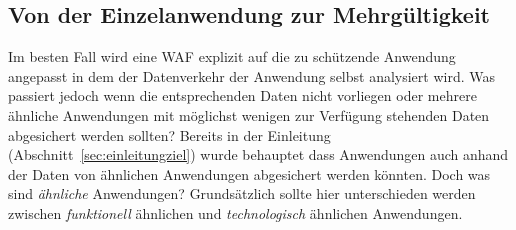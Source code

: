 


\subsection{Von der Einzelanwendung zur Mehrgültigkeit}
Im besten Fall wird eine WAF explizit auf die zu schützende Anwendung angepasst in dem der Datenverkehr der Anwendung selbst analysiert wird. Was passiert jedoch wenn die entsprechenden Daten nicht vorliegen oder mehrere ähnliche Anwendungen mit möglichst wenigen zur Verfügung stehenden Daten abgesichert werden sollten? Bereits in der Einleitung (Abschnitt~\ref{sec:einleitungziel}) wurde behauptet dass Anwendungen auch anhand der Daten von ähnlichen Anwendungen abgesichert werden könnten. Doch was sind \glqq\emph{ähnliche}\grqq{} Anwendungen? Grundsätzlich sollte hier unterschieden werden zwischen \emph{funktionell} ähnlichen und \emph{technologisch} ähnlichen Anwendungen.\\

